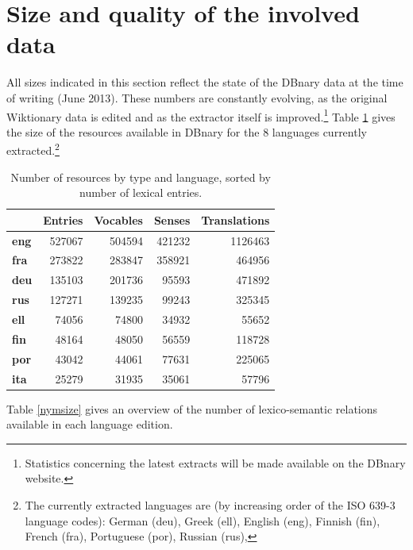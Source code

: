 \documentclass[sw]{iosart2c}
\begin{document}
\section{Size and quality of the involved data}

All sizes indicated in this section reflect the state of the DBnary data at the time of writing (June 2013). These numbers are constantly evolving, as the original Wiktionary data is edited and as the extractor itself is improved.\footnote{Statistics concerning the latest extracts will be made available on the DBnary website.}
 Table \ref{globalsize} gives the size of the resources available in DBnary for the 8 languages currently extracted.\footnote{The currently extracted languages are (by increasing order of the ISO 639-3 language codes):
German (deu),
Greek (ell),
English (eng),
Finnish (fin),
French (fra),
Portuguese (por),
Russian (rus),
}

\begin{table}[htb]
\begin{tabular}{lrrrr}
 & \textbf{Entries} & \textbf{Vocables} & \textbf{Senses} & \textbf{Translations}\\
 \hline
\textbf{eng} & 527067 & 504594 & 421232 & 1126463 \\
\textbf{fra} & 273822 & 283847 & 358921 & 464956 \\
\textbf{deu} & 135103 & 201736 & 95593 & 471892 \\
\textbf{rus} & 127271 & 139235 & 99243 & 325345 \\
\textbf{ell} & 74056 & 74800 & 34932 & 55652 \\
\textbf{fin} & 48164 & 48050 & 56559 & 118728 \\
\textbf{por} & 43042 & 44061 & 77631 & 225065 \\
\textbf{ita} & 25279 & 31935 & 35061 & 57796 \\
\end{tabular}
\caption{Number of resources by type and language, sorted by number of lexical entries.}\label{globalsize}
\end{table}



Table \ref{nymsize} gives an overview of the number of lexico-semantic relations available in each language edition.
\end{document}
